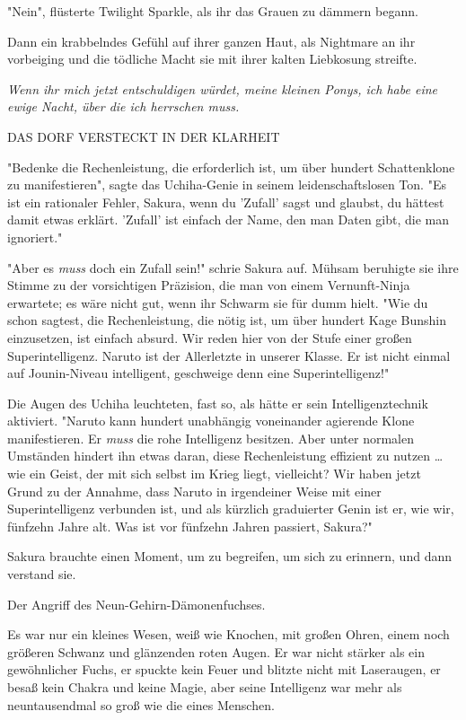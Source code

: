 {"Nein", flüsterte Twilight Sparkle, als ihr das Grauen zu dämmern begann.

Dann ein krabbelndes Gefühl auf ihrer ganzen Haut, als Nightmare an ihr vorbeiging und die tödliche Macht sie mit ihrer kalten Liebkosung streifte.

\emph{\emph{Wenn ihr mich jetzt entschuldigen würdet, meine kleinen Ponys, ich habe eine ewige Nacht, über die ich herrschen muss.}}

DAS DORF VERSTECKT IN DER KLARHEIT

"Bedenke die Rechenleistung, die erforderlich ist, um über hundert Schattenklone zu manifestieren", sagte das Uchiha-Genie in seinem leidenschaftslosen Ton. "Es ist ein rationaler Fehler, Sakura, wenn du 'Zufall' sagst und glaubst, du hättest damit etwas erklärt. 'Zufall' ist einfach der Name, den man Daten gibt, die man ignoriert."

"Aber es \emph{muss} doch ein Zufall sein!" schrie Sakura auf. Mühsam beruhigte sie ihre Stimme zu der vorsichtigen Präzision, die man von einem Vernunft-Ninja erwartete; es wäre nicht gut, wenn ihr Schwarm sie für dumm hielt. "Wie du schon sagtest, die Rechenleistung, die nötig ist, um über hundert Kage Bunshin einzusetzen, ist einfach absurd. Wir reden hier von der Stufe einer großen Superintelligenz. Naruto ist der Allerletzte in unserer Klasse. Er ist nicht einmal auf Jounin-Niveau intelligent, geschweige denn eine Superintelligenz!"

Die Augen des Uchiha leuchteten, fast so, als hätte er sein Intelligenztechnik aktiviert. "Naruto kann hundert unabhängig voneinander agierende Klone manifestieren. Er \emph{muss} die rohe Intelligenz besitzen. Aber unter normalen Umständen hindert ihn etwas daran, diese Rechenleistung effizient zu nutzen … wie ein Geist, der mit sich selbst im Krieg liegt, vielleicht? Wir haben jetzt Grund zu der Annahme, dass Naruto in irgendeiner Weise mit einer Superintelligenz verbunden ist, und als kürzlich graduierter Genin ist er, wie wir, fünfzehn Jahre alt. Was ist vor fünfzehn Jahren passiert, Sakura?"

Sakura brauchte einen Moment, um zu begreifen, um sich zu erinnern, und dann verstand sie.

Der Angriff des Neun-Gehirn-Dämonenfuchses.

Es war nur ein kleines Wesen, weiß wie Knochen, mit großen Ohren, einem noch größeren Schwanz und glänzenden roten Augen. Er war nicht stärker als ein gewöhnlicher Fuchs, er spuckte kein Feuer und blitzte nicht mit Laseraugen, er besaß kein Chakra und keine Magie, aber seine Intelligenz war mehr als neuntausendmal so groß wie die eines Menschen.

}
